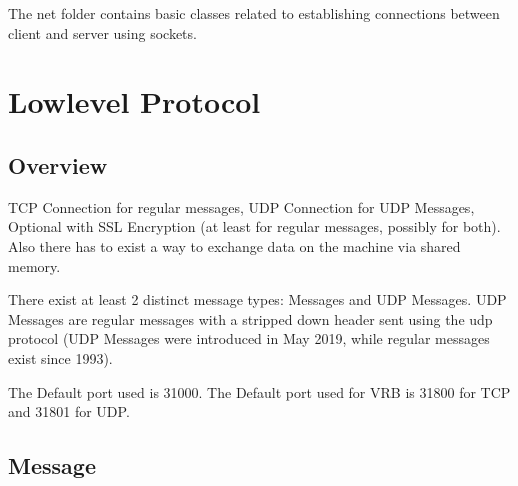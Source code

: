 \newenvironment{tcpmessage}[2]{\rowcolors{2}{send.light}{send.dark} \paragraph{#1 (Type #2)}\mbox{}\\ \begin{longtable}{||p{2cm}|p{4cm}|p{2cm}|p{6cm}||}
		\hline \rowcolor{send.head} \textbf{Index} & \textbf{Name} & \textbf{Type}& \textbf{Description} \\
		\hline\hline
		\rowcolor{send.subhead} \multicolumn{4}{||c||}{\textbf{HEADER}} \\
		\hline
			\paramfour{0..3}{sender}{int32}{Sender ID, max 3 byte verwenden}
			\paramfour{4..7}{sender\_type}{int32}{Sender Type}
			\paramfour{8..11}{message\_type}{int32}{MessageType #2} %
			\paramfour{12..15}{length}{int32}{Length of payload in Bytes}
			\rowcolor{send.subhead} \multicolumn{4}{||c||}{\textbf{PAYLOAD}} \\
			\hline
}{\end{longtable}}

The net folder contains basic classes related to establishing connections between client and server using sockets.

\section{Lowlevel Protocol}

\subsection{Overview}

TCP Connection for regular messages, UDP Connection for UDP Messages, Optional with SSL Encryption (at least for regular messages, possibly for both). Also there has to exist a way to exchange data on the machine via shared memory.

There exist at least 2 distinct message types: Messages and UDP Messages. UDP Messages are regular messages with a stripped down header sent using the udp protocol (UDP Messages were introduced in May 2019, while regular messages exist since 1993).

The Default port used is 31000.
The Default port used for VRB is 31800 for TCP and 31801 for UDP.


\subsection{Message}

